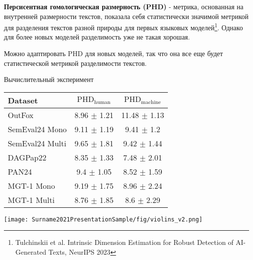 \documentclass{beamer}
\begin{document}
\begin{frame}{}
\textbf{Персисентная гомологическая размерность (PHD) } - метрика, основанная на внутренней размерности текстов, показала себя статистически значимой метрикой для разделения текстов разной природы для первых языковых моделей\footnote{Tulchinskii et al. Intrinsic Dimension Estimation for Robust Detection of AI-Generated Texts, NeurIPS 2023}. Однако для более новых моделей разделимость уже не такая хорошая.


\begin{tcolorbox}[colback=white,colframe=skyblue,title=Гипотеза]
    Можно адаптировать PHD для новых моделей, так что она все еще будет статистической метрикой разделимости текстов.
\end{tcolorbox}
\end{frame}

\begin{frame}{Вычислительный эксперимент}

\begin{table}
    \centering
    \begin{tabular}{l|c|c}
        Dataset & $\text{PHD}_{\text{human}}$ & $\text{PHD}_{\text{machine}}$ \\
        \hline
        OutFox & 8.96 $\pm$ 1.21 & 11.48 $\pm$ 1.13\\
        SemEval24 Mono & 9.11 $\pm$ 1.19 & 9.41 $\pm$ 1.2 \\
        SemEval24 Multi & 9.65 $\pm$ 1.81 & 9.42 $\pm$ 1.44  \\
         DAGPap22 & 8.35 $\pm$ 1.33 & 7.48 $\pm$ 2.01  \\
          PAN24 & 9.4 $\pm$ 1.05 & 8.52 $\pm$ 1.59  \\
          MGT-1 Mono & 9.19 $\pm$ 1.75 & 8.96 $\pm$ 2.24 \\
          MGT-1 Multi & 8.76 $\pm$ 1.85 & 8.6 $\pm$ 2.29 \\
    \hline    
    \end{tabular}
\end{table}


    \texttt{[image: Surname2021PresentationSample/fig/violins\_v2.png]}
\end{frame}
\end{document}
